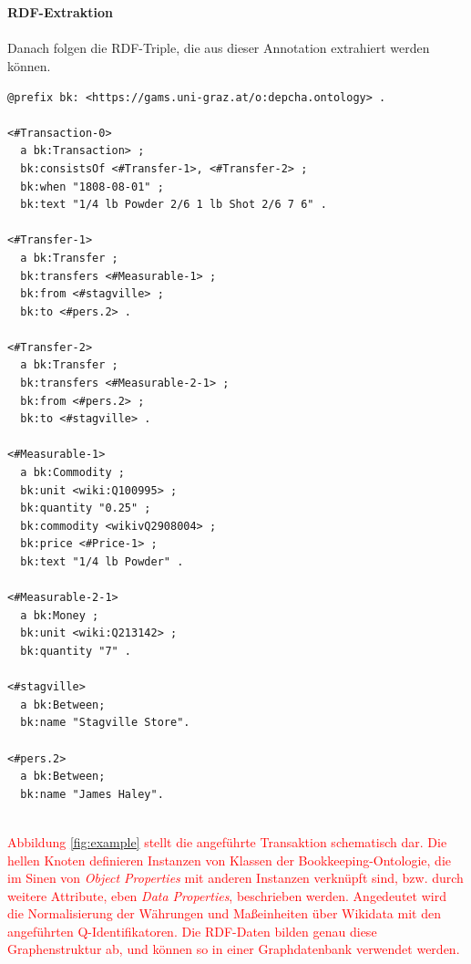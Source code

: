\documentclass[12pt,a4paper]{article}
\begin{document}
\\
\\
\textbf{RDF-Extraktion}
\\
\\
Danach folgen die RDF-Triple, die aus dieser Annotation extrahiert werden können.
\begin{lstlisting}[]
@prefix bk: <https://gams.uni-graz.at/o:depcha.ontology> .

<#Transaction-0>
  a bk:Transaction> ;
  bk:consistsOf <#Transfer-1>, <#Transfer-2> ;
  bk:when "1808-08-01" ;
  bk:text "1/4 lb Powder 2/6 1 lb Shot 2/6 7 6" .

<#Transfer-1>
  a bk:Transfer ;
  bk:transfers <#Measurable-1> ;
  bk:from <#stagville> ;
  bk:to <#pers.2> .

<#Transfer-2>
  a bk:Transfer ;
  bk:transfers <#Measurable-2-1> ;
  bk:from <#pers.2> ;
  bk:to <#stagville> .

<#Measurable-1>
  a bk:Commodity ;
  bk:unit <wiki:Q100995> ;
  bk:quantity "0.25" ;
  bk:commodity <wikivQ2908004> ;
  bk:price <#Price-1> ;
  bk:text "1/4 lb Powder" .

<#Measurable-2-1>
  a bk:Money ;
  bk:unit <wiki:Q213142> ;
  bk:quantity "7" .
  
<#stagville>
  a bk:Between;
  bk:name "Stagville Store".
  
<#pers.2>
  a bk:Between;
  bk:name "James Haley".
  
\end{lstlisting}
\textcolor{red}{
Abbildung \ref{fig:example} stellt die angeführte Transaktion schematisch dar. Die hellen Knoten definieren Instanzen von Klassen der Bookkeeping-Ontologie, die im Sinen von \textit{Object Properties} mit anderen Instanzen verknüpft sind, bzw. durch weitere Attribute, eben \textit{Data Properties}, beschrieben werden. Angedeutet wird die Normalisierung der Währungen und Maßeinheiten über Wikidata mit den angeführten Q-Identifikatoren. Die RDF-Daten bilden genau diese Graphenstruktur ab, und können so in einer Graphdatenbank verwendet werden.  
}
\end{document}
